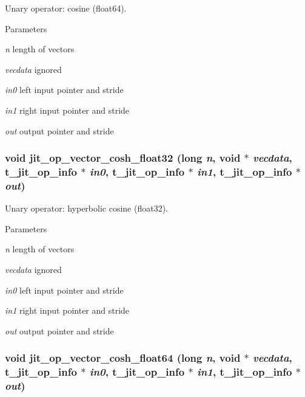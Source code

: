 Unary operator: cosine (float64). 
\begin{DoxyParams}{Parameters}
\item[{\em n}]length of vectors \item[{\em vecdata}]ignored \item[{\em in0}]left input pointer and stride \item[{\em in1}]right input pointer and stride \item[{\em out}]output pointer and stride \end{DoxyParams}
\hypertarget{group__opvecmod_ga26f840eb263eb7892a5bdf4f3ab09af5}{
\subsubsection[{jit\_\-op\_\-vector\_\-cosh\_\-float32}]{\setlength{\rightskip}{0pt plus 5cm}void jit\_\-op\_\-vector\_\-cosh\_\-float32 (long {\em n}, \/  void $\ast$ {\em vecdata}, \/  {\bf t\_\-jit\_\-op\_\-info} $\ast$ {\em in0}, \/  {\bf t\_\-jit\_\-op\_\-info} $\ast$ {\em in1}, \/  {\bf t\_\-jit\_\-op\_\-info} $\ast$ {\em out})}}
\label{group__opvecmod_ga26f840eb263eb7892a5bdf4f3ab09af5}


Unary operator: hyperbolic cosine (float32). 
\begin{DoxyParams}{Parameters}
\item[{\em n}]length of vectors \item[{\em vecdata}]ignored \item[{\em in0}]left input pointer and stride \item[{\em in1}]right input pointer and stride \item[{\em out}]output pointer and stride \end{DoxyParams}
\hypertarget{group__opvecmod_ga79b3b3a9e216deb72c603c4e2212b549}{
\subsubsection[{jit\_\-op\_\-vector\_\-cosh\_\-float64}]{\setlength{\rightskip}{0pt plus 5cm}void jit\_\-op\_\-vector\_\-cosh\_\-float64 (long {\em n}, \/  void $\ast$ {\em vecdata}, \/  {\bf t\_\-jit\_\-op\_\-info} $\ast$ {\em in0}, \/  {\bf t\_\-jit\_\-op\_\-info} $\ast$ {\em in1}, \/  {\bf t\_\-jit\_\-op\_\-info} $\ast$ {\em out})}}
\label{group__opvecmod_ga79b3b3a9e216deb72c603c4e2212b549}



